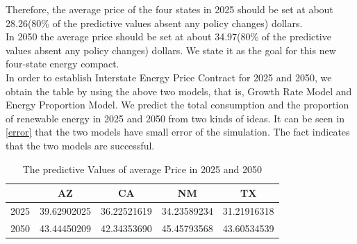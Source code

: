 \documentclass{mcmthesis}
\begin{document}
Therefore, the average price of the four states in 2025 should be set at about 28.26(80\% of the predictive values absent any policy changes) dollars.\\
In 2050 the average price should be set at about 34.97(80\% of the predictive values absent any policy changes) dollars. We state it as the goal for this new four-state energy compact.\\ In order to establish Interstate Energy Price Contract for 2025 and 2050, we obtain the table by using the above two models, that is, Growth Rate Model and Energy Proportion Model. We predict the total consumption and the proportion of renewable energy in 2025 and 2050 from two kinds of ideas. It can be seen in \autoref{error} that the two models have small error of the simulation. The fact indicates that the two models are successful.\\
\begin{table}[h]
	\centering
	\caption{The predictive Values of average Price in 2025 and 2050}
	\label{predic}
	\begin{tabular}{|c|c|c|c|c|}
		\hline
		& AZ          & CA          & NM          & TX          \\ \hline
		2025 & 39.62902025 & 36.22521619 & 34.23589234 & 31.21916318 \\ \hline
		2050 & 43.44450209 & 42.34353690 & 45.45793568 & 43.60534539 \\ \hline
	\end{tabular}
\end{table}
\end{document}
